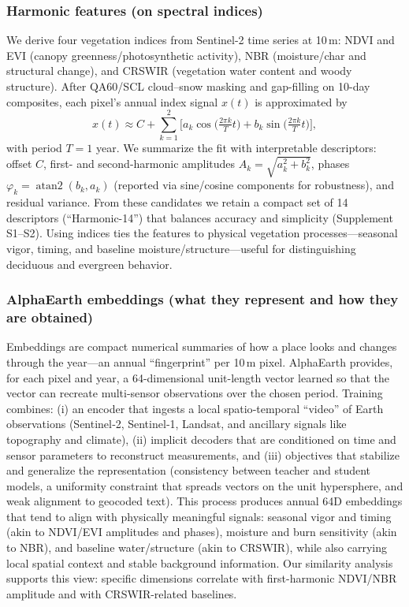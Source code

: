 \documentclass[utf8]{FrontiersinHarvard}
\begin{document}
\subsubsection{Harmonic features (on spectral indices)}
We derive four vegetation indices from Sentinel-2 time series at 10\,m: NDVI and EVI (canopy greenness/photosynthetic activity), NBR (moisture/char and structural change), and CRSWIR (vegetation water content and woody structure). After QA60/SCL cloud–snow masking and gap-filling on 10-day composites, each pixel's annual index signal \(x(t)\) is approximated by
\begin{equation}
  x(t) \approx C + \sum_{k=1}^{2} \big[ a_k \cos\!\big( \tfrac{2\pi k}{T} t \big) + b_k \sin\!\big( \tfrac{2\pi k}{T} t \big) \big],
\end{equation}
with period \(T=1\) year. We summarize the fit with interpretable descriptors: offset \(C\), first- and second-harmonic amplitudes \(A_k = \sqrt{a_k^2 + b_k^2}\), phases \(\varphi_k = \operatorname{atan2}(b_k, a_k)\) (reported via sine/cosine components for robustness), and residual variance. From these candidates we retain a compact set of 14 descriptors (“Harmonic-14”) that balances accuracy and simplicity (Supplement S1–S2). Using indices ties the features to physical vegetation processes—seasonal vigor, timing, and baseline moisture/structure—useful for distinguishing deciduous and evergreen behavior.

\subsubsection{AlphaEarth embeddings (what they represent and how they are obtained)}
Embeddings are compact numerical summaries of how a place looks and changes through the year—an annual “fingerprint” per 10\,m pixel. AlphaEarth provides, for each pixel and year, a 64-dimensional unit-length vector learned so that the vector can recreate multi-sensor observations over the chosen period. Training combines: (i) an encoder that ingests a local spatio‑temporal “video” of Earth observations (Sentinel‑2, Sentinel‑1, Landsat, and ancillary signals like topography and climate), (ii) implicit decoders that are conditioned on time and sensor parameters to reconstruct measurements, and (iii) objectives that stabilize and generalize the representation (consistency between teacher and student models, a uniformity constraint that spreads vectors on the unit hypersphere, and weak alignment to geocoded text). This process produces annual 64D embeddings that tend to align with physically meaningful signals: seasonal vigor and timing (akin to NDVI/EVI amplitudes and phases), moisture and burn sensitivity (akin to NBR), and baseline water/structure (akin to CRSWIR), while also carrying local spatial context and stable background information. Our similarity analysis supports this view: specific dimensions correlate with first-harmonic NDVI/NBR amplitude and with CRSWIR-related baselines.
\end{document}
